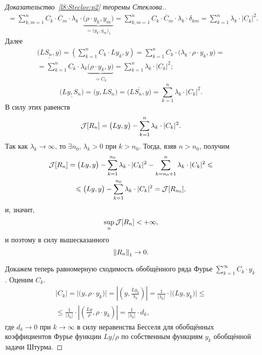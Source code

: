 \begin{proof}[Доказательство~\ref{l8:Steclov:p2} теоремы Стеклова.]
\begin{multline*}
		=\sum\limits_{k,m=1}^n C_k\cdot\overline{C}_m\cdot\lambda_k\cdot\underbrace{\big(\rho\cdot y_k,y_m\big)}_{\textstyle=\big(y_k,y_m\big)_1}=\sum\limits_{k,m=1}^n C_k\cdot\overline{C}_m\cdot\lambda_k\cdot\delta_{km}=\sum\limits_{k=1}^n\lambda_k\cdot|C_k|^2.
	\end{multline*}
	Далее
	\begin{multline*}
		\underline{\big(LS_n,y\big)}=\left(\sum\limits_{k=1}^n C_k\cdot Ly_k,y\right)=\sum\limits_{k=1}^nC_k\cdot\big(\lambda_k\cdot\rho\cdot y_k,y\big)=\\=\sum\limits_{k=1}^n C_k\cdot\lambda_k\underbrace{\big(\rho\cdot y_k,y\big)}_{\textstyle=\overline{C}_k}=\sum\limits_{k=1}^n\lambda_k\cdot|C_k|^2;
	\end{multline*}
	\begin{equation*}
		\underline{\big(Ly,S_n\big)}=\big(y,LS_n\big)=\overline{\big(LS_n,y\big)}=\sum\limits_{k=1}^n\lambda_k\cdot|C_k|^2.
	\end{equation*}
	В силу этих равенств
	\begin{equation*}
		\mathcal{J}[R_n]=\big(Ly,y\big)-\sum\limits_{k=1}^n\lambda_k\cdot|C_k|^2.
	\end{equation*}
	Так как $\lambda_k\to\infty$, то $\exists n_0$, $\lambda_k>0$ при $k>n_0$. Тогда, взяв $n>n_0$, получим 
	\begin{multline*}
		\mathcal{J}[R_n]=\big(Ly,y\big)-\sum\limits_{k=1}^{n_0}\lambda_k\cdot|C_k|^2-\sum\limits_{k=n_0+1}^n\lambda_k\cdot|C_k|^2\leqslant\\\leqslant\big(Ly,y\big)-\sum\limits_{k=1}^{n_0}\lambda_k\cdot|C_k|^2=\mathcal{J}[R_{n_0}],
	\end{multline*}
	и, значит, 
	\begin{equation*}
		\sup\limits_{n}\mathcal{J}[R_n]<+\infty,
	\end{equation*}
	и поэтому в силу вышесказанного 
	\begin{equation*}
		\left\|R_n\right\|_1\to0.
	\end{equation*}
	
	Докажем теперь равномерную сходимость обобщённого ряда Фурье $\displaystyle\sum\limits_{k=1}^{\infty}C_k\cdot y_k$. Оценим $C_k$.
	\begin{multline*}
		|C_k|=\big|\big(y,\rho\cdot y_k\big)\big|=\left|\left(y,\frac{Ly_k}{\lambda_k}\right)\right|=\frac1{|\lambda_k|}\cdot\big|\big(Ly,y_k\big)\big|\leqslant\\\leqslant\frac1{|\lambda_k|}\cdot\left|\left(\frac{Ly}{\rho},\rho\cdot y_k\right)\right|=\frac1{|\lambda_k|}\cdot d_k,
	\end{multline*} 
	где $d_k\to0$ при $k\to\infty$ в силу неравенства Бесселя для обобщённых коэффициентов Фурье функции $Ly/\rho$ по собственным функциям $y_k$ обобщённой задачи Штурма.
	

\end{proof}

